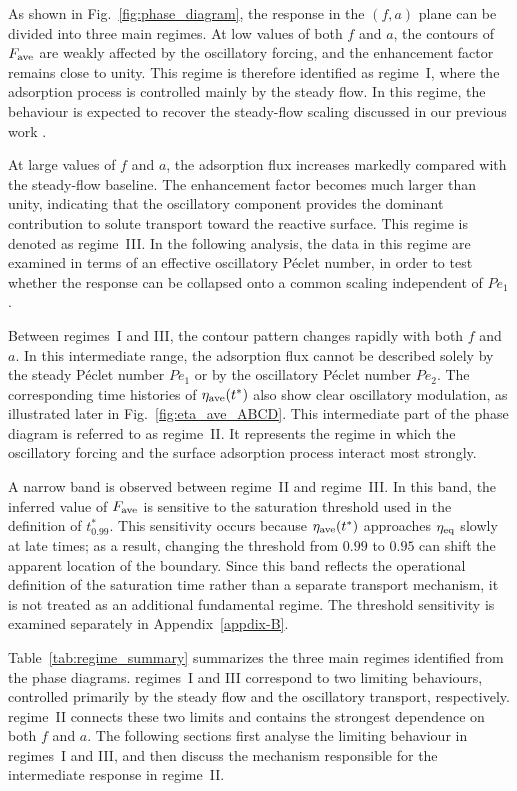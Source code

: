 \documentclass[lineno]{JFM-FLM_Au}
\begin{document}
As shown in Fig.~\ref{fig:phase_diagram}, the response in the $(f,a)$ plane
can be divided into three main regimes. At low values of both $f$ and $a$,
the contours of $F_{\rm ave}$ are weakly affected by the oscillatory forcing,
and the enhancement factor remains close to unity. This regime is therefore
identified as regime~I, where the adsorption process is controlled mainly
by the steady flow. In this regime, the behaviour is expected to recover the
steady-flow scaling discussed in our previous work \citep{Huang2024}.

At large values of $f$ and $a$, the adsorption flux increases markedly
compared with the steady-flow baseline. The enhancement factor becomes
much larger than unity, indicating that the oscillatory component provides
the dominant contribution to solute transport toward the reactive surface.
This regime is denoted as regime~III. In the following analysis, the data in
this regime are examined in terms of an effective oscillatory Péclet number,
in order to test whether the response can be collapsed onto a common
scaling independent of $Pe_1$.

Between regimes~I and III, the contour pattern changes rapidly with both
$f$ and $a$. In this intermediate range, the adsorption flux cannot be
described solely by the steady Péclet number $Pe_1$ or by the oscillatory
Péclet number $Pe_2$. The corresponding time histories of
$\eta_{\rm ave}(t^*)$ also show clear oscillatory modulation, as illustrated
later in Fig.~\ref{fig:eta_ave_ABCD}. This intermediate part of the phase
diagram is referred to as regime~II. It represents the regime in which the
oscillatory forcing and the surface adsorption process interact most strongly.

A narrow band is observed between regime~II and regime~III. In this band,
the inferred value of $F_{\rm ave}$ is sensitive to the saturation threshold
used in the definition of $t_{0.99}^*$. This sensitivity occurs because
$\eta_{\rm ave}(t^*)$ approaches $\eta_{\rm eq}$ slowly at late times; as a
result, changing the threshold from $0.99$ to $0.95$ can shift the apparent
location of the boundary. Since this band reflects the operational definition
of the saturation time rather than a separate transport mechanism, it is not
treated as an additional fundamental regime. The threshold sensitivity is
examined separately in Appendix~\ref{appdix-B}.

Table~\ref{tab:regime_summary} summarizes the three main regimes identified
from the phase diagrams. regimes~I and III correspond to two limiting
behaviours, controlled primarily by the steady flow and the oscillatory
transport, respectively. regime~II connects these two limits and contains
the strongest dependence on both $f$ and $a$. The following sections first
analyse the limiting behaviour in regimes~I and III, and then discuss the
mechanism responsible for the intermediate response in regime~II.
\end{document}
